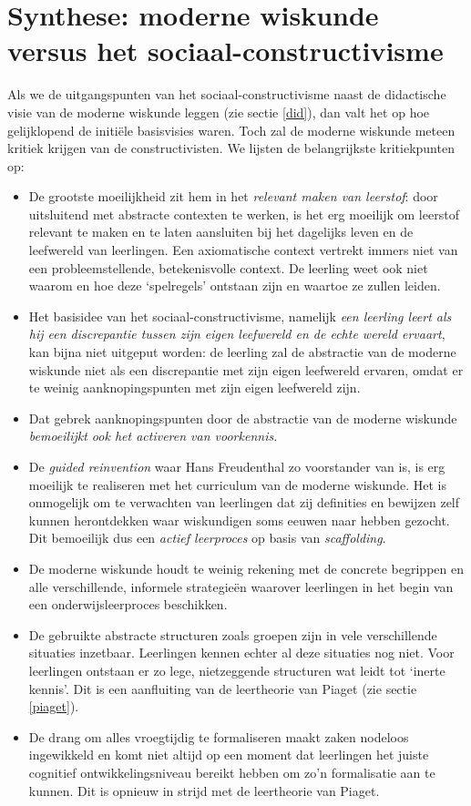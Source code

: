 \documentclass[a4paper,11pt]{article}
\begin{document}
\newpage
\section{Synthese: moderne wiskunde versus het sociaal-constructivisme}
Als we de uitgangspunten van het sociaal-constructivisme naast de didactische 
visie van de moderne wiskunde leggen (zie sectie \ref{did}), dan valt het op hoe 
gelijklopend de initiële basisvisies waren. Toch zal de moderne wiskunde meteen 
kritiek krijgen van de constructivisten. We lijsten de belangrijkste 
kritiekpunten op:

\begin{itemize}
  \item De grootste moeilijkheid zit hem in het \textit{relevant maken van 
  leerstof}: door uitsluitend met abstracte contexten te werken, is 
  het erg moeilijk om leerstof relevant te maken en te laten aansluiten bij het 
  dagelijks leven en de leefwereld van leerlingen. Een axiomatische context 
  vertrekt immers niet van een probleemstellende, betekenisvolle context. De 
  leerling weet ook niet waarom en hoe deze `spelregels' ontstaan zijn en waartoe ze
  zullen leiden.
  \item Het basisidee van het 
  sociaal-constructivisme, namelijk \textit{een leerling leert als hij een discrepantie 
  tussen zijn eigen leefwereld en de echte wereld ervaart}, kan bijna niet 
  uitgeput worden: de leerling zal de abstractie van de moderne wiskunde niet 
  als een discrepantie met zijn eigen leefwereld ervaren, omdat er te weinig 
  aanknopingspunten met zijn eigen leefwereld zijn.
  \item Dat gebrek aanknopingspunten door de abstractie van de moderne wiskunde 
 \textit{ bemoeilijkt ook het activeren van voorkennis}.
  \item De \textit{guided reinvention} waar Hans Freudenthal zo voorstander van is, is 
  erg moeilijk te realiseren met het curriculum van de moderne wiskunde. Het is 
  onmogelijk om te verwachten van leerlingen dat zij definities en bewijzen 
  zelf kunnen herontdekken waar wiskundigen soms eeuwen naar hebben gezocht. Dit 
  bemoeilijk dus een \textit{actief leerproces} op basis van \textit{scaffolding}.
  \item De moderne wiskunde houdt te weinig rekening met de concrete begrippen 
  en alle verschillende, informele strategieën waarover leerlingen in het begin van een 
  onderwijsleerproces beschikken.
  \item De gebruikte abstracte structuren zoals groepen zijn in vele 
  verschillende situaties inzetbaar. Leerlingen kennen echter al deze situaties 
  nog niet. Voor leerlingen ontstaan er zo lege, nietzeggende structuren wat 
  leidt tot `inerte kennis'. Dit is een aanfluiting van de leertheorie van 
  Piaget (zie sectie \ref{piaget}).
   \item De drang om alles vroegtijdig te formaliseren maakt zaken nodeloos 
  ingewikkeld en komt niet altijd op een moment dat leerlingen het juiste 
  cognitief ontwikkelingsniveau bereikt hebben om zo'n formalisatie aan te 
  kunnen. Dit is opnieuw in strijd met de leertheorie van Piaget.
\end{itemize}
\end{document}
